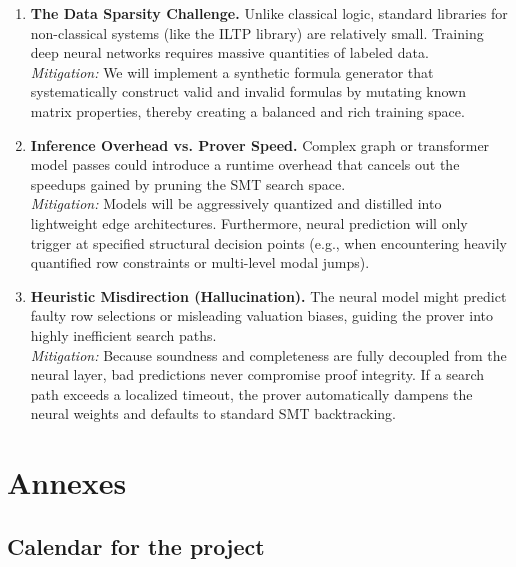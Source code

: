 \documentclass[a4paper]{article}
\begin{document}
\begin{enumerate}
    \item \textbf{The Data Sparsity Challenge.} Unlike classical logic, standard libraries for non-classical systems (like the ILTP library) are relatively small. Training deep neural networks requires massive quantities of labeled data.
    \\ \textit{Mitigation:} We will implement a synthetic formula generator that systematically construct valid and invalid formulas by mutating known matrix properties, thereby creating a balanced and rich training space.
    \item \textbf{Inference Overhead vs. Prover Speed.} Complex graph or transformer model passes could introduce a runtime overhead that cancels out the speedups gained by pruning the SMT search space.
    \\ \textit{Mitigation:} Models will be aggressively quantized and distilled into lightweight edge architectures. Furthermore, neural prediction will only trigger at specified structural decision points (e.g., when encountering heavily quantified row constraints or multi-level modal jumps).
    \item \textbf{Heuristic Misdirection (Hallucination).} The neural model might predict faulty row selections or misleading valuation biases, guiding the prover into highly inefficient search paths.
    \\ \textit{Mitigation:} Because soundness and completeness are fully decoupled from the neural layer, bad predictions never compromise proof integrity. If a search path exceeds a localized timeout, the prover automatically dampens the neural weights and defaults to standard SMT backtracking.
\end{enumerate}

\pagebreak

\section*{Annexes}

\subsection*{Calendar for the project}
\end{document}
